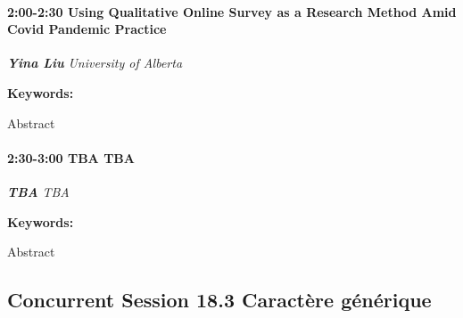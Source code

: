 \documentclass[
]{book}
\begin{document}
\begin{session}
\hypertarget{using-qualitative-online-survey-as-a-research-method-amid-covid-pandemic-practice}{%
\paragraph*{\texorpdfstring{2:00-2:30 \textbar{} \textbf{Using
Qualitative Online Survey as a Research Method Amid Covid Pandemic}
\textbar{}
Practice}{2:00-2:30 \textbar{} Using Qualitative Online Survey as a Research Method Amid Covid Pandemic \textbar{} Practice}}\label{using-qualitative-online-survey-as-a-research-method-amid-covid-pandemic-practice}}

\textbf{\emph{Yina Liu}} \textbar{} \emph{University of Alberta}

\textbf{Keywords:}

Abstract
\end{session}

\begin{session}
\hypertarget{tba-tba}{%
\paragraph*{\texorpdfstring{2:30-3:00 \textbar{} \textbf{TBA} \textbar{}
TBA}{2:30-3:00 \textbar{} TBA \textbar{} TBA}}\label{tba-tba}}

\textbf{\emph{TBA}} \textbar{} \emph{TBA}

\textbf{Keywords:}

Abstract
\end{session}

\hypertarget{concurrent-session-18.3-wildcard}{%
\subsection*{Concurrent Session 18.3 \textbar{} Caractère générique}\label{concurrent-session-18.3-wildcard}}
\end{document}
